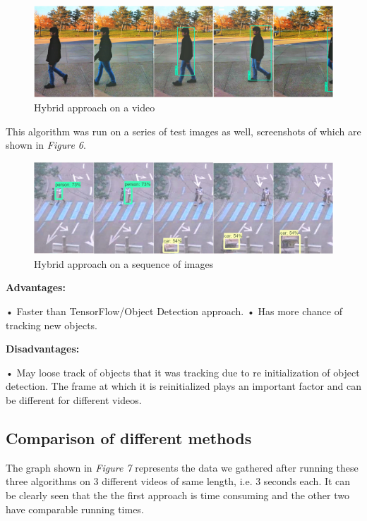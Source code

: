 \documentclass[10pt,twocolumn,letterpaper]{article}
\begin{document}
\begin{figure}
\includegraphics[width=\linewidth]{Hybrid.jpg}
\caption{Hybrid approach on a video}
\end{figure}

This algorithm was run on a series of test images as well, screenshots of which are shown in \textit{Figure 6}.

\begin{figure}
\includegraphics[width=\linewidth]{Hybrid_images.jpg}
\caption{Hybrid approach on a sequence of images}
\end{figure}

\textbf{Advantages:}

•	Faster than TensorFlow/Object Detection approach.
•	Has more chance of tracking new objects.

\textbf{Disadvantages:}

•	May loose track of objects that it was tracking due to re initialization of object detection. The frame at which it is reinitialized plays an important factor and can be different for different videos.

\subsection{Comparison of different methods}


The graph shown in \textit{Figure 7} represents the data we gathered after running these three algorithms on 3 different videos of same length, i.e. 3 seconds each. It can be clearly seen that the the first approach is time consuming and the other two have comparable running times.  
\end{document}

